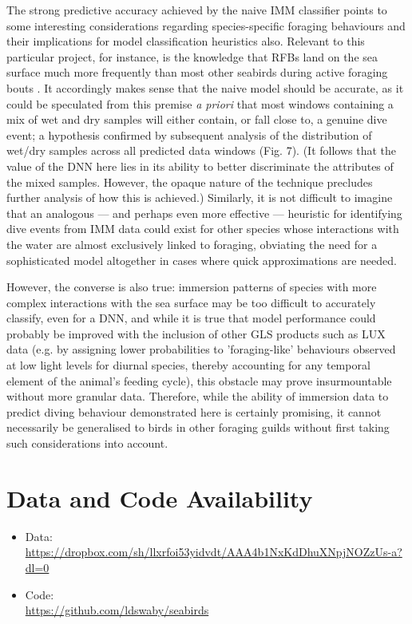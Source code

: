 \documentclass[11pt]{article}
\begin{document}
    The strong predictive accuracy achieved by the naive IMM classifier points to some interesting considerations regarding species-specific foraging behaviours and their implications for model classification heuristics also. Relevant to this particular project, for instance, is the knowledge that RFBs land on the sea surface much more frequently than most other seabirds during active foraging bouts \citep{weimerskirch2005three}. It accordingly makes sense that the naive model should be accurate, as it could be speculated from this premise \emph{a priori} that most windows containing a mix of wet and dry samples will either contain, or fall close to, a genuine dive event; a hypothesis confirmed by subsequent analysis of the distribution of wet/dry samples across all predicted data windows (Fig. 7). (It follows that the value of the DNN here lies in its ability to better discriminate the attributes of the mixed samples. However, the opaque nature of the technique precludes further analysis of how this is achieved.) Similarly, it is not difficult to imagine that an analogous — and perhaps even more effective — heuristic for identifying dive events from IMM data could exist for other species whose interactions with the water are almost exclusively linked to foraging, obviating the need for a sophisticated model altogether in cases where quick approximations are needed. 
    
    However, the converse is also true: immersion patterns of species with more complex interactions with the sea surface may be too difficult to accurately classify, even for a DNN, and while it is true that model performance could probably be improved with the inclusion of other GLS products such as LUX data (e.g. by assigning lower probabilities to 'foraging-like' behaviours observed at low light levels for diurnal species, thereby accounting for any temporal element of the animal's feeding cycle), this obstacle may prove insurmountable without more granular data. Therefore, while the ability of immersion data to predict diving behaviour demonstrated here is certainly promising, it cannot necessarily be generalised to birds in other foraging guilds without first taking such considerations into account.
    
    
    \newpage
    \nolinenumbers
    \section*{Data and Code Availability}
    
    \begin{itemize}
      \item Data: \url{https://dropbox.com/sh/llxrfoi53yidvdt/AAA4b1NxKdDhuXNpjNOZzUs-a?dl=0}
      \item Code: \\ \url{https://github.com/ldswaby/seabirds}
    \end{itemize}
    
\end{document}
